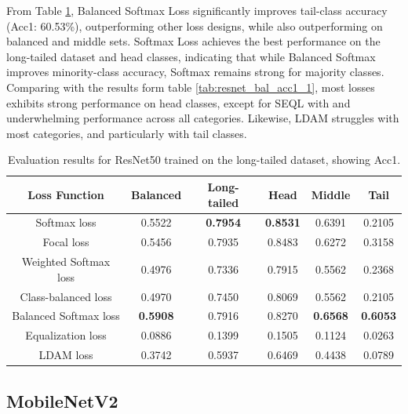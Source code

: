 From Table \ref{tab:resnet_lt_acc1_1}, Balanced Softmax Loss significantly improves tail-class accuracy (Acc1: 60.53\%), outperforming other loss designs, while also outperforming on balanced and middle sets. Softmax Loss achieves the best performance on the long-tailed dataset and head classes, indicating that while Balanced Softmax improves minority-class accuracy, Softmax remains strong for majority classes. Comparing with the results form table \ref{tab:resnet_bal_acc1_1}, most losses exhibits strong performance on head classes, except for SEQL with and underwhelming performance across all categories. Likewise, LDAM struggles with most categories, and particularly with tail classes.

\begin{table}[h!]
    \centering
    \caption{Evaluation results for ResNet50 trained on the long-tailed dataset, showing Acc1.}
    \begin{tabular}{cccccc}
        \toprule
        Loss Function & Balanced & Long-tailed & Head & Middle & Tail \\ 
        \midrule
        Softmax loss   & 0.5522 & \textbf{0.7954} & \textbf{0.8531} & 0.6391 & 0.2105 \\
        Focal loss   & 0.5456 & 0.7935 & 0.8483 & 0.6272 & 0.3158 \\
        Weighted Softmax loss   & 0.4976 & 0.7336 & 0.7915 & 0.5562 & 0.2368 \\
        Class-balanced loss   & 0.4970 & 0.7450 & 0.8069 & 0.5562 & 0.2105 \\
        Balanced Softmax loss   & \textbf{0.5908} & 0.7916 & 0.8270 & \textbf{0.6568} & \textbf{0.6053} \\
        Equalization loss   & 0.0886 & 0.1399 & 0.1505 & 0.1124 &  0.0263 \\
        LDAM loss   & 0.3742 & 0.5937 & 0.6469 & 0.4438 & 0.0789 \\
        \bottomrule
    \end{tabular}
    \label{tab:resnet_lt_acc1_1}
\end{table}


\subsection{MobileNetV2}

